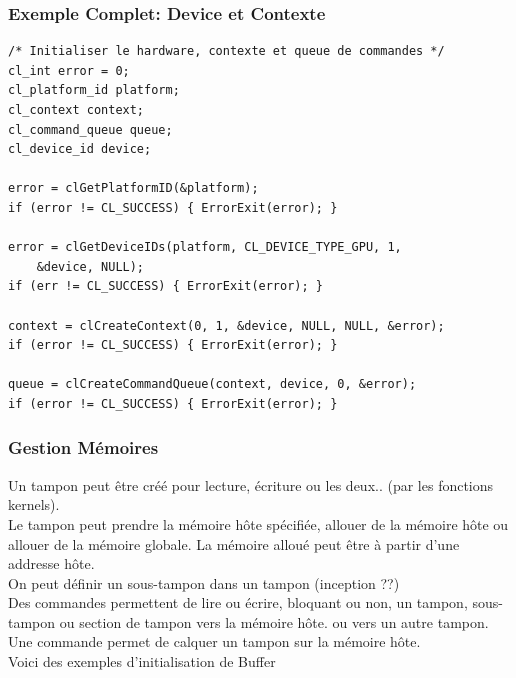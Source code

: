 \documentclass[oneside]{book}
\begin{document}
\subsubsection{Exemple Complet: Device et Contexte}
\begin{lstlisting}
/* Initialiser le hardware, contexte et queue de commandes */
cl_int error = 0;
cl_platform_id platform;
cl_context context;
cl_command_queue queue;
cl_device_id device;

error = clGetPlatformID(&platform);
if (error != CL_SUCCESS) { ErrorExit(error); }

error = clGetDeviceIDs(platform, CL_DEVICE_TYPE_GPU, 1,
	&device, NULL);
if (err != CL_SUCCESS) { ErrorExit(error); }

context = clCreateContext(0, 1, &device, NULL, NULL, &error);
if (error != CL_SUCCESS) { ErrorExit(error); }

queue = clCreateCommandQueue(context, device, 0, &error);
if (error != CL_SUCCESS) { ErrorExit(error); }
\end{lstlisting}

\subsubsection{Gestion Mémoires}
Un tampon peut être créé pour lecture, écriture ou les deux.. (par les fonctions kernels).\\

Le tampon peut prendre la mémoire hôte spécifiée, allouer de la mémoire hôte ou allouer de la mémoire globale. La mémoire alloué peut être à partir d'une addresse hôte. \\

On peut définir un sous-tampon dans un tampon (inception ??)\\

Des commandes permettent de lire ou écrire, bloquant ou non, un tampon, sous-tampon ou section de tampon vers la mémoire hôte. ou vers un autre tampon.\\

Une commande permet de calquer un tampon sur la mémoire hôte.\\

Voici des exemples d'initialisation de Buffer
\end{document}
